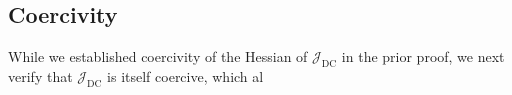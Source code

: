 \documentclass[final,1p,times]{elsarticle}
\begin{document}


\subsection{Coercivity}

While we established coercivity of the Hessian of $\mathcal{J}_{\mathrm{DC}}$ in the prior proof, we next verify that $ \mathcal{J}_{\mathrm{DC}} $ is itself coercive, which al
\end{document}

